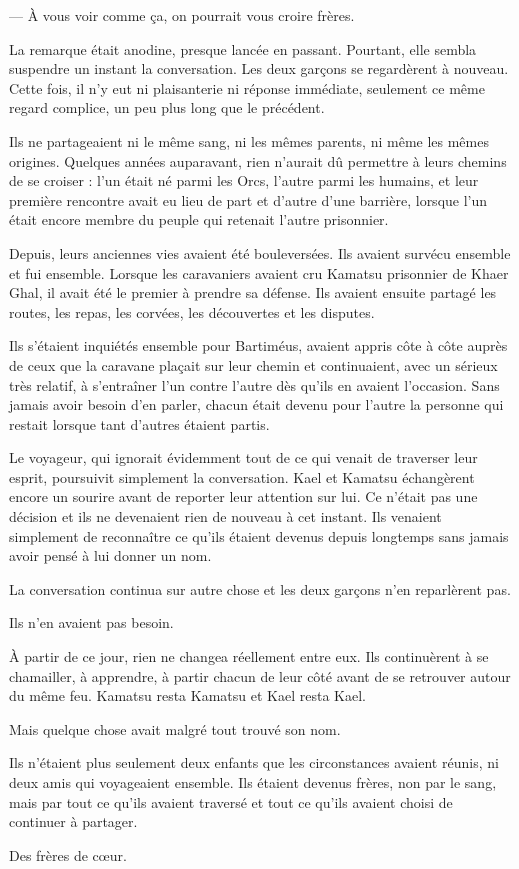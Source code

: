— À vous voir comme ça, on pourrait vous croire frères.

La remarque était anodine, presque lancée en passant. Pourtant, elle sembla
suspendre un instant la conversation. Les deux garçons se regardèrent à
nouveau. Cette fois, il n'y eut ni plaisanterie ni réponse immédiate, seulement
ce même regard complice, un peu plus long que le précédent.

Ils ne partageaient ni le même sang, ni les mêmes parents, ni même les mêmes
origines. Quelques années auparavant, rien n'aurait dû permettre à leurs
chemins de se croiser : l'un était né parmi les Orcs, l'autre parmi les
humains, et leur première rencontre avait eu lieu de part et d'autre d'une
barrière, lorsque l'un était encore membre du peuple qui retenait l'autre
prisonnier.

Depuis, leurs anciennes vies avaient été bouleversées. Ils avaient survécu
ensemble et fui ensemble. Lorsque les caravaniers avaient cru Kamatsu
prisonnier de Khaer Ghal, il avait été le premier à prendre sa défense. Ils
avaient ensuite partagé les routes, les repas, les corvées, les découvertes et
les disputes.

Ils s'étaient inquiétés ensemble pour Bartiméus, avaient appris côte à côte
auprès de ceux que la caravane plaçait sur leur chemin et continuaient, avec un
sérieux très relatif, à s'entraîner l'un contre l'autre dès qu'ils en avaient
l'occasion. Sans jamais avoir besoin d'en parler, chacun était devenu pour
l'autre la personne qui restait lorsque tant d'autres étaient partis.

Le voyageur, qui ignorait évidemment tout de ce qui venait de traverser leur
esprit, poursuivit simplement la conversation. Kael et Kamatsu échangèrent
encore un sourire avant de reporter leur attention sur lui. Ce n'était pas une
décision et ils ne devenaient rien de nouveau à cet instant. Ils venaient
simplement de reconnaître ce qu'ils étaient devenus depuis longtemps sans
jamais avoir pensé à lui donner un nom.

La conversation continua sur autre chose et les deux garçons n'en reparlèrent
pas.

Ils n'en avaient pas besoin.

À partir de ce jour, rien ne changea réellement entre eux. Ils continuèrent à
se chamailler, à apprendre, à partir chacun de leur côté avant de se retrouver
autour du même feu. Kamatsu resta Kamatsu et Kael resta Kael.

Mais quelque chose avait malgré tout trouvé son nom.

Ils n'étaient plus seulement deux enfants que les circonstances avaient réunis,
ni deux amis qui voyageaient ensemble. Ils étaient devenus frères, non par le
sang, mais par tout ce qu'ils avaient traversé et tout ce qu'ils avaient choisi
de continuer à partager.

Des frères de cœur.